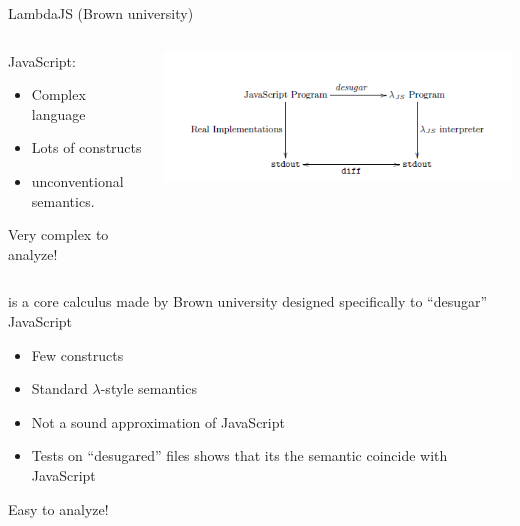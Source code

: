 \documentclass[11pt]{beamer}
\begin{document}
\begin{frame}{LambdaJS (Brown university\cite{LambdaJS})}
\begin{columns}[T]
\begin{column}{.48\textwidth}
JavaScript:
\begin{itemize}
\item Complex language
\item Lots of constructs
\item unconventional semantics.
\end{itemize}
Very complex to analyze!
\end{column}
\begin{column}{.50\textwidth}
\includegraphics[scale=0.42]{Images/LambdaJS.PNG}
\end{column}
\end{columns}\vspace{0.5cm}

\ljs\cite{LambdaJS} is a core calculus made by Brown university designed specifically to ``desugar'' JavaScript
\begin{itemize}
\item Few constructs
\item Standard $\lambda$-style semantics
\item Not a sound approximation of JavaScript
\item Tests on ``desugared'' files shows that its the semantic coincide with JavaScript
\end{itemize}
Easy to analyze!
\end{frame}
\end{document}
